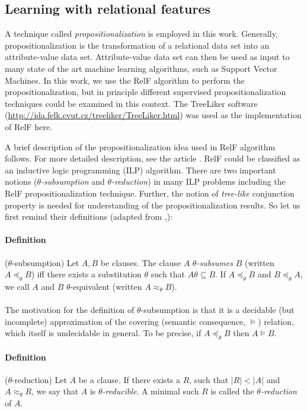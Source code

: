\documentclass[11pt,twoside,a4paper]{book}
\newcounter{Definition}
\begin{document}
\subsection{Learning with relational features}
A technique called \emph{propositionalization} is employed in this work. 
Generally, propositionalization is the transformation of a relational data set
into an attribute-value data set.
Attribute-value data set can then be used as input to many
state of the art machine learning algorithms, such as 
Support Vector Machines.
In this work, we use the RelF algorithm to perform the propositionalization,
but in principle different supervised propositionalization
techniques could be examined in this context.
The TreeLiker software (\url{http://ida.felk.cvut.cz/treeliker/TreeLiker.html})
was used as the implementation of RelF here.

A brief description of the propositionalization idea used in RelF algorithm follows.
For more detailed description, see the article \cite{relf}.
RelF could be classified as an inductive logic programming (ILP) algorithm.
There are two important notions (\emph{$\theta$-subsumption} and \emph{$\theta$-reduction})
in many ILP problems including the RelF propositionalization technique.
Further, the notion of \emph{tree-like} conjunction property is needed 
for understanding of the propositionalization results.
So let us first remind their definitions (adapted from \cite{szabova},\cite{relf}): 

\paragraph{Definition} ($\theta$-subsumption) Let $A,B$ be clauses. 
The clause $A$ \emph{$\theta$-subsumes} $B$ (written $A \preceq_{\theta} B$)
iff there exists a substitution $\theta$ such that $ A \theta \subseteq B$.
If $A \preceq_{\theta} B$ and $B \preceq_{\theta} A$, we call $A$ and $B$ 
$\theta$-equivalent (written $A \approx_{\theta} B$).

\paragraph{ } The motivation for the definition of $\theta$-subsumption is that it is a decidable
(but incomplete) approximation of the covering (semantic consequence, $\vDash$) relation,
which itself is undecidable in general.
To be precise, if $A \preceq_{\theta} B$ then $A \vDash B$. \cite{plotkin}

\paragraph{Definition} ($\theta$-reduction) Let $A$ be a clause.
If there exists a $R$, such that $|R| < |A|$ and $A \approx_{\theta} R$,
we say that $A$ is \emph{$\theta$-reducible}. 
A minimal such $R$ is called the \emph{$\theta$-reduction} of $A$.
\end{document}
